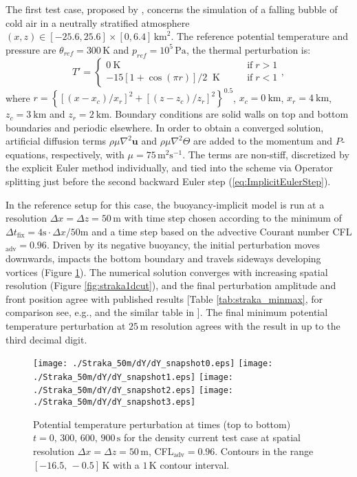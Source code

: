 \documentclass{ametsoc}
\newcommand{\sblue}[1]{\textcolor{sblue}{#1}}
\newcommand{\revision}[1]{\sblue{#1}}
\theoremstyle{definition}
\newcommand{\eq}[1]{(\ref{#1})}
\begin{document}
The first test case, proposed by \cite{StrakaEtAl1993}, concerns the simulation of a falling bubble of cold air in a neutrally stratified atmosphere $(x,z)\in[-25.6,25.6]\times[0,6.4]\,\textrm{km}^2$. The reference potential temperature and pressure  are $\theta_{ref}=300\,\textrm{K}$ and $p_{ref}=10^5\,\textrm{Pa}$, the thermal perturbation is:
%
\begin{equation}
 T'=\begin{cases}
           0~\textrm{K} \qquad&\textrm{if}\;r>1\\
	   -15\left[1+\cos(\pi r)\right]/2 \;\;\textrm{K}\qquad&\textrm{if}\;r<1   
          \end{cases},
\end{equation} 
%
where $r=\left\{[(x-x_c)/x_r]^2+[(z-z_c)/z_r]^2\right\}^{0.5}$, $x_c=0~\textrm{km}$, $x_r=4~\textrm{km}$, $z_c=3~\textrm{km}$ and $z_r=2~\textrm{km}$. 
%
Boundary conditions are solid walls on top and bottom boundaries and periodic elsewhere. In order to obtain a converged solution, artificial diffusion terms $\rho\mu\nabla^2\mathbf{u}$ and
$\rho\mu\nabla^2\Theta$ are added to the momentum and $P$-equations, respectively, with $\mu=75\,\textrm{m$^2$s$^{-1}$}$. The terms are non-stiff, discretized by the explicit Euler method individually, and tied into the scheme via Operator splitting just before the second backward
Euler step \eq{eq:ImplicitEulerStep}.

In the reference setup for this case, the buoyancy-implicit model is run at a resolution $\Delta x=\Delta z=50\,\textrm{m}$ with time step chosen according \revision{to the minimum of $\Delta t_{\text{fix}} = 4\text{s} \cdot \Delta x/50\text{m}$ and a time step based on the advective Courant number CFL$_\textrm{adv}=0.96$.} Driven by its negative buoyancy, the initial perturbation moves downwards, impacts the bottom boundary and travels sideways developing vortices (Figure \ref{fig:straka}). The numerical solution converges with increasing spatial resolution (Figure \ref{fig:straka1dcut}), and the final perturbation amplitude and front position agree with published results [Table \ref{tab:straka_minmax}, for comparison see, e.g., \cite{GiraldoRestelli2008} and the similar table in \cite{MelvinEtAl2018}]. The final minimum potential temperature perturbation at $25\,\textrm{m}$ resolution agrees with the result in \cite{MelvinEtAl2018} up to the third decimal digit.

\begin{figure}
\centering
 \texttt{[image: ./Straka\_50m/dY/dY\_snapshot0.eps]}
 \texttt{[image: ./Straka\_50m/dY/dY\_snapshot1.eps]}
 \texttt{[image: ./Straka\_50m/dY/dY\_snapshot2.eps]}
 \texttt{[image: ./Straka\_50m/dY/dY\_snapshot3.eps]}
 \caption{Potential temperature perturbation at times (top to bottom) $t=0,\,300,\,600,\,900\,\textrm{s}$ for the density current test case at spatial resolution $\Delta x=\Delta z=50\,\textrm{m}$, CFL$_\textrm{adv}=0.96$. Contours in the range $[-16.5,\,-0.5]\,\textrm{K}$ with a $1\,\textrm{K}$ contour interval.}
 \label{fig:straka}
\end{figure}
\end{document}
